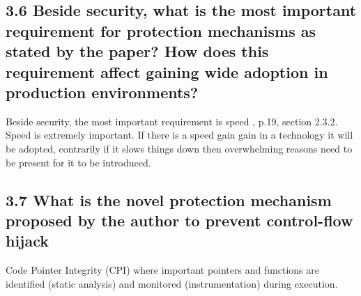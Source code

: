 \documentclass[
	letterpaper, %
	10pt, %
	unnumberedsections, %
	twoside, %
]{LTJournalArticle}
\begin{document}

\subsection{3.6 Beside security, what is the most important requirement for protection mechanisms as stated by the paper? How does this requirement affect  gaining wide adoption in production environments?}

Beside security, the most important requirement is speed \cite{MemDissertation}, p.19, section 2.3.2. Speed is extremely important. If there is a speed gain gain in a technology it will be adopted, contrarily if it slows things down then overwhelming reasons need to be present for it to be introduced.  

\subsection{3.7 What is the novel protection mechanism proposed by the author to prevent control-flow hijack}
Code Pointer Integrity (CPI) where important pointers and functions are identified (static analysis) and monitored (instrumentation) during execution. 

\clearpage
\printbibliography %






\end{document}

